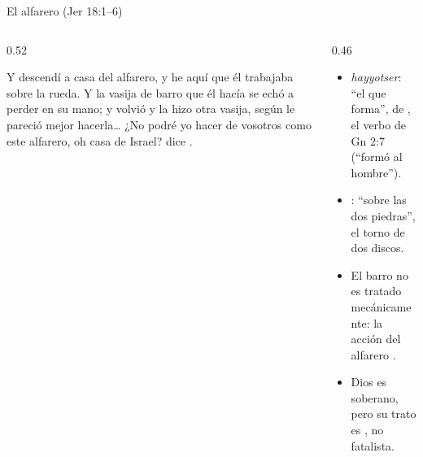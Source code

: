 \begin{frame}{El alfarero (Jer 18:1--6)}
\begin{columns}[t,onlytextwidth]
\begin{column}{0.52\textwidth}
\begin{cita}Y descendí a casa del alfarero, y he aquí que él trabajaba sobre la rueda. Y la vasija de barro que él hacía se echó a perder en su mano; y volvió y la hizo otra vasija, según le pareció mejor hacerla\ldots{} ¿No podré yo hacer de vosotros como este alfarero, oh casa de Israel? dice \SENOR.\end{cita}
\end{column}
\begin{column}{0.46\textwidth}\small
\begin{itemize}
\item {} \emph{hayyotser}: ``el que forma'', de , el verbo de Gn 2:7 (``formó al hombre'').
\item {}: ``sobre las dos piedras'', el torno de dos discos.
\item El barro no es tratado mecánicamente: la acción del alfarero .
\item Dios es soberano, pero su trato es , no fatalista.
\end{itemize}
\end{column}
\end{columns}
\end{frame}

